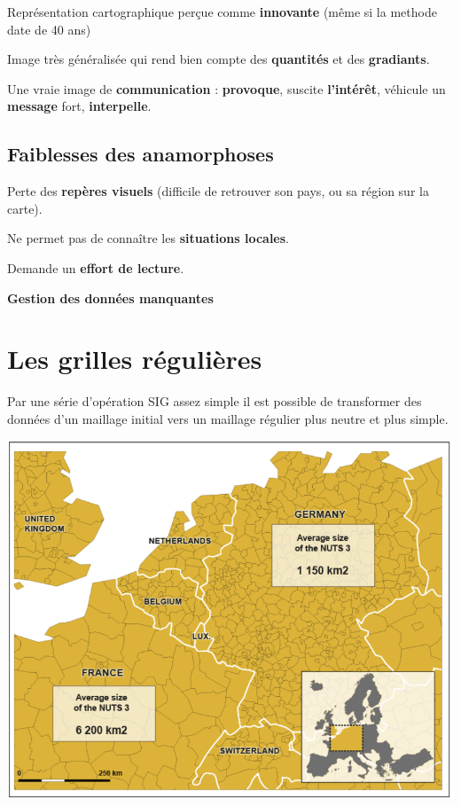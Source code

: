 \documentclass[]{book}
\begin{document}
Représentation cartographique perçue comme \textbf{innovante} (même si la methode date de 40 ans)

Image très généralisée qui rend bien compte des \textbf{quantités} et des \textbf{gradiants}.

Une vraie image de \textbf{communication} : \textbf{provoque}, suscite \textbf{l'intérêt}, véhicule un \textbf{message} fort, \textbf{interpelle}.

\hypertarget{faiblesses-des-anamorphoses}{%
\subsection{Faiblesses des anamorphoses}\label{faiblesses-des-anamorphoses}}

Perte des \textbf{repères visuels} (difficile de retrouver son pays, ou sa région sur la carte).

Ne permet pas de connaître les \textbf{situations locales}.

Demande un \textbf{effort de lecture}.

\textbf{Gestion des données manquantes}

\hypertarget{les-grilles-regulieres}{%
\section{Les grilles régulières}\label{les-grilles-regulieres}}

Par une série d'opération SIG assez simple il est possible de transformer des données d'un maillage initial vers un maillage régulier plus neutre et plus simple.

\includegraphics{img/maup.png}
\end{document}
